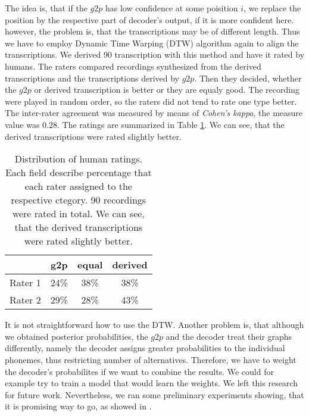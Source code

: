 \par
The idea is, that if the $g2p$ has low confidence at some poisition $i$, we replace the position by the respective part of decoder's output, if it is more confident here.
however, the problem is, that the transcriptions may be of different length.
Thus we have to employ Dynamic Time Warping (DTW) algorithm again to align the transcriptions.
We derived 90 transcription with this method and have it rated by humans.
The raters compared recordings synthesized from the derived transcriptions and the transcriptions derived by $g2p$.
Then they decided, whether the $g2p$ or derived transcription is better or they are equaly good.
The recording were played in random order, so the raters did not tend to rate one type better.
The inter-rater agreement was measured by means of \textit{Cohen's kappa}, the measure value was $0.28$.
The ratings are summarized in Table \ref{combrat}.
We can see, that the derived transcriptions were rated slightly better.
\begin{table}
\begin{center}
\begin{tabular}{ |c|c|c|c| } 
 \hline
 &\textbf{g2p} & \textbf{equal} & \textbf{derived} \\ \hline
 Rater 1 & 24\% & 38\% & 38\% \\ \hline 
 Rater 2 & 29\% & 28\% & 43\% \\ \hline
 \end{tabular}
\end{center}
\label{combrat}
\caption{Distribution of human ratings. Each field describe percentage that each rater assigned to the respective ctegory. 90 recordings were rated in total. We can see, that the derived transcriptions were rated slightly better.}
\end{table}
\par
It is not straightforward how to use the DTW.
Another problem is, that although we obtained posterior probabilities, the $g2p$ and the decoder treat their graphs differently, namely the decoder assigns greater probabilities to the individual phonemes, thus restricting number of alternatives.
Therefore, we have to weight the decoder's probabilites if we want to combine the results.
We could for example try to train a model that would learn the weights.
We left this research for future work.
Nevertheless, we ran some preliminary experiments showing, that it is promising way to go, as showed in .
